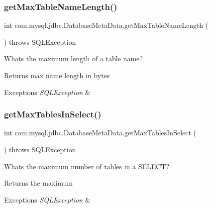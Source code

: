 \subsubsection{\texorpdfstring{get\+Max\+Table\+Name\+Length()}{getMaxTableNameLength()}}
{\footnotesize\ttfamily int com.\+mysql.\+jdbc.\+Database\+Meta\+Data.\+get\+Max\+Table\+Name\+Length (\begin{DoxyParamCaption}{ }\end{DoxyParamCaption}) throws S\+Q\+L\+Exception}

What\textquotesingle{}s the maximum length of a table name?

\begin{DoxyReturn}{Returns}
max name length in bytes 
\end{DoxyReturn}

\begin{DoxyExceptions}{Exceptions}
{\em S\+Q\+L\+Exception} & \\
\hline
\end{DoxyExceptions}
\mbox{\label{classcom_1_1mysql_1_1jdbc_1_1_database_meta_data_a5ecdf1dfcc3a31428d0bc6ada467cf2d}} 
\subsubsection{\texorpdfstring{get\+Max\+Tables\+In\+Select()}{getMaxTablesInSelect()}}
{\footnotesize\ttfamily int com.\+mysql.\+jdbc.\+Database\+Meta\+Data.\+get\+Max\+Tables\+In\+Select (\begin{DoxyParamCaption}{ }\end{DoxyParamCaption}) throws S\+Q\+L\+Exception}

What\textquotesingle{}s the maximum number of tables in a S\+E\+L\+E\+CT?

\begin{DoxyReturn}{Returns}
the maximum 
\end{DoxyReturn}

\begin{DoxyExceptions}{Exceptions}
{\em S\+Q\+L\+Exception} & \\
\hline
\end{DoxyExceptions}
\mbox{\label{classcom_1_1mysql_1_1jdbc_1_1_database_meta_data_a6326960bc256397168656ab048a8a5b9}} 

